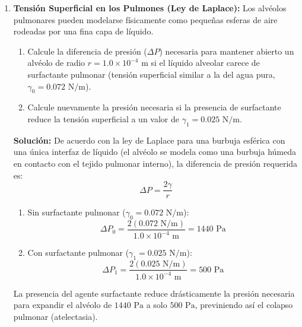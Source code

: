 \documentclass[12pt,letterpaper]{article}
\begin{document}
\begin{enumerate}
    \textbf{Solución:}
    La tensión superficial ($\gamma$) está definida por la fuerza por unidad de longitud de la superficie de contacto:
    \[
    \gamma = \frac{F}{L}
    \]
    Dado que la película líquida tiene dos superficies (una interna y otra externa al anillo), la longitud total de contacto $L$ es el doble del perímetro del anillo:
    \[
    L = 2 \cdot (2\pi \cdot r) = 2\pi \cdot d
    \]
    donde $d = 4 \text{ cm} = 0.04 \text{ m}$ es el diámetro.
    Sustituyendo la longitud total de contacto:
    \[
    L = 2\pi (0.04 \text{ m}) \approx 0.2513 \text{ m}
    \]
    Calculamos la tensión superficial:
    \[
    \gamma = \frac{1.46 \times 10^{-2} \text{ N}}{0.2513 \text{ m}} \approx 0.0581 \text{ N/m} = 5.81 \times 10^{-2} \text{ N/m}
    \]

    \vspace{0.3cm}
    \item \textbf{Tensión Superficial en los Pulmones (Ley de Laplace):} Los alvéolos pulmonares pueden modelarse físicamente como pequeñas esferas de aire rodeadas por una fina capa de líquido. 
    \begin{enumerate}
        \item Calcule la diferencia de presión ($\Delta P$) necesaria para mantener abierto un alvéolo de radio $r = 1.0 \times 10^{-4} \text{ m}$ si el líquido alveolar carece de surfactante pulmonar (tensión superficial similar a la del agua pura, $\gamma_0 = 0.072 \text{ N/m}$).
        \item Calcule nuevamente la presión necesaria si la presencia de surfactante reduce la tensión superficial a un valor de $\gamma_1 = 0.025 \text{ N/m}$.
    \end{enumerate}
    
    \textbf{Solución:}
    De acuerdo con la ley de Laplace para una burbuja esférica con una única interfaz de líquido (el alvéolo se modela como una burbuja húmeda en contacto con el tejido pulmonar interno), la diferencia de presión requerida es:
    \[
    \Delta P = \frac{2\gamma}{r}
    \]
    
    \begin{enumerate}
        \item Sin surfactante pulmonar ($\gamma_0 = 0.072 \text{ N/m}$):
        \[
        \Delta P_0 = \frac{2(0.072 \text{ N/m})}{1.0 \times 10^{-4} \text{ m}} = 1440 \text{ Pa}
        \]
        \item Con surfactante pulmonar ($\gamma_1 = 0.025 \text{ N/m}$):
        \[
        \Delta P_1 = \frac{2(0.025 \text{ N/m})}{1.0 \times 10^{-4} \text{ m}} = 500 \text{ Pa}
        \]
    \end{enumerate}
    La presencia del agente surfactante reduce drásticamente la presión necesaria para expandir el alvéolo de $1440 \text{ Pa}$ a solo $500 \text{ Pa}$, previniendo así el colapso pulmonar (atelectasia).


\end{enumerate}
\end{document}
